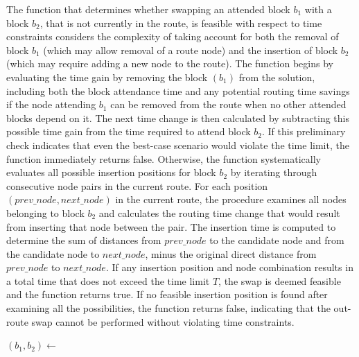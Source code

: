 The function that determines whether swapping an attended block $b_1$ with a block $b_2$, that is not currently in the route, is feasible with respect to time constraints considers the complexity of taking account for both the removal of block $b_1$ (which may allow removal of a route node) and the insertion of block $b_2$ (which may require adding a new node to the route).
The function begins by evaluating the time gain by removing the block $(b_1)$ from the solution, including both the block attendance time and any potential routing time savings if the node attending $b_1$ can be removed from the route when no other attended blocks depend on it.
The next time change is then calculated by subtracting this possible time gain from the time required to attend block $b_2$.
If this preliminary check indicates that even the best-case scenario would violate the time limit, the function immediately returns false.
Otherwise, the function systematically evaluates all possible insertion positions for block $b_2$ by iterating through consecutive node pairs in the current route.
For each position $(prev\_node, next\_node)$ in the current route, the procedure examines all nodes belonging to block $b_2$ and calculates the routing time change that would result from inserting that node between the pair. The insertion time is computed to determine the sum of distances from $prev\_node$ to the candidate node and from the candidate node to $next\_node$, minus the original direct distance from $prev\_node$ to $next\_node$.
If any insertion position and node combination results in a total time that does not exceed the time limit $T$, the swap is deemed feasible and the function returns true. If no feasible insertion position is found after examining all the possibilities, the function returns false, indicating that the out-route swap cannot be performed without violating time constraints.

\begin{algorithm}[h!]
	\caption{Select Random Swap Blocks} \label{alg:select-random-swap-blocks}
	\SetAlgoLined

	$(b_1, b_2) \leftarrow$ \;
	\;
\end{algorithm}

